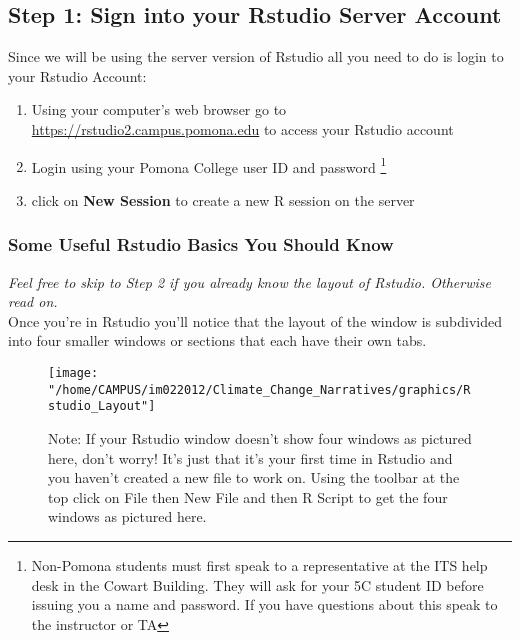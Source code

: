 \documentclass{article}\usepackage[]{graphicx}\usepackage[]{color}
\begin{document}
  \subsection*{Step 1: Sign into your Rstudio Server Account}
Since we will be using the server version of Rstudio all you need to do is login to your Rstudio Account:
    \begin{enumerate}
    \item Using your computer's web browser go to \url{https://rstudio2.campus.pomona.edu} to access your Rstudio account
    \item Login using your Pomona College user ID and password \footnote{Non-Pomona students must first speak to a representative at the ITS help desk in the Cowart Building. They will ask for your 5C student ID before issuing you a name and password. If you have questions about this speak to the instructor or TA}
    \item click on \textbf{New Session} to create a new R session on the server
    \end{enumerate}
\pagebreak

  \subsubsection*{Some Useful Rstudio Basics You Should Know}
  \emph{Feel free to skip to Step 2 if you already know the layout of Rstudio. Otherwise read on.}\\
  Once you're in Rstudio you'll notice that the layout of the window is subdivided into four smaller windows or sections that each have their own tabs. \vspace{5mm}

\begin{figure}[h!]
  \texttt{[image: "/home/CAMPUS/im022012/Climate\_Change\_Narratives/graphics/Rstudio\_Layout"]}
  \caption*{Note: If your Rstudio window doesn't show four windows as pictured here, don't worry! It's just that it's your first time in Rstudio and you haven't created a new file to work on. Using the toolbar at the top click on File then New File and then R Script to get the four windows as pictured here.}
\end{figure}  
\end{document}

